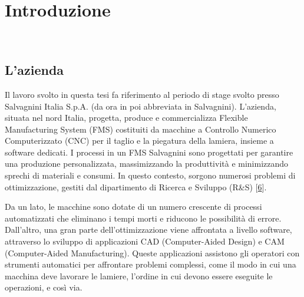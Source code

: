 \chapter{Introduzione}
\label{cap:introduzione}

 \\




\section{L'azienda} \hypertarget{salvagnini}{}

Il lavoro svolto in questa tesi fa riferimento al periodo di stage svolto presso Salvagnini Italia S.p.A. (da ora in poi abbreviata in Salvagnini). L'azienda, situata nel nord Italia, progetta, produce e commercializza Flexible Manufacturing System (FMS) costituiti da macchine a Controllo Numerico Computerizzato (CNC) per il taglio e la piegatura della lamiera, insieme a software dedicati. I processi in un FMS Salvagnini sono progettati per garantire una produzione personalizzata, massimizzando la produttività e minimizzando sprechi di materiali e consumi. In questo contesto, sorgono numerosi problemi di ottimizzazione, gestiti dal dipartimento di Ricerca e Sviluppo (R\&S)  [\hyperlink{bibliografia}{6}].

Da un lato, le macchine sono dotate di un numero crescente di processi automatizzati che eliminano i tempi morti e riducono le possibilità di errore. Dall'altro, una gran parte dell'ottimizzazione viene affrontata a livello software, attraverso lo sviluppo di applicazioni CAD (Computer-Aided Design) e CAM (Computer-Aided Manufacturing). Queste applicazioni assistono gli operatori con strumenti automatici per affrontare problemi complessi, come il modo in cui una macchina deve lavorare le lamiere, l'ordine in cui devono essere eseguite le operazioni, e così via.


